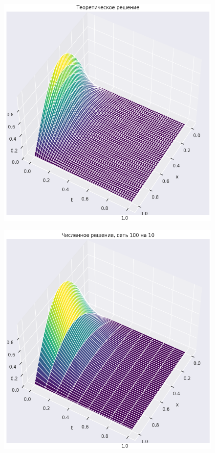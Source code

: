 \documentclass[14pt,a4paper]{extarticle}
\newcommand{\1}{\mathbbm{1}}
\begin{document}
\begin{figure}
    \centering
    \includegraphics[scale=0.6]{figs/TeorSol.png}
\end{figure}

\begin{figure}
    \centering
    \includegraphics[scale=0.6]{figs/t10010.png}
\end{figure}
\end{document}
